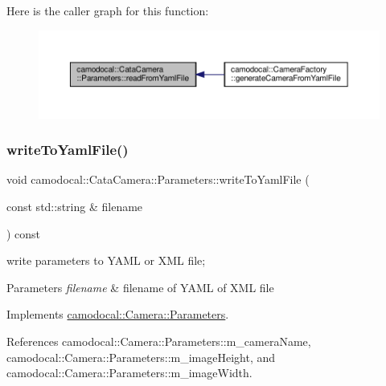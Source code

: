 Here is the caller graph for this function\+:\nopagebreak
\begin{figure}[H]
\begin{center}
\leavevmode
\includegraphics[width=350pt]{classcamodocal_1_1CataCamera_1_1Parameters_a756399dd928f1a0a9b0eb7922361939f_icgraph}
\end{center}
\end{figure}
\mbox{\label{classcamodocal_1_1CataCamera_1_1Parameters_a9bd3a31bc31a3f4e1becfbd2bbb43331}} 
\subsubsection{\texorpdfstring{write\+To\+Yaml\+File()}{writeToYamlFile()}}
{\footnotesize\ttfamily void camodocal\+::\+Cata\+Camera\+::\+Parameters\+::write\+To\+Yaml\+File (\begin{DoxyParamCaption}\item[{const std\+::string \&}]{filename }\end{DoxyParamCaption}) const\hspace{0.3cm}{\ttfamily [virtual]}}



write parameters to Y\+A\+ML or X\+ML file; 


\begin{DoxyParams}{Parameters}
{\em filename} & filename of Y\+A\+ML of X\+ML file \\
\hline
\end{DoxyParams}


Implements \hyperlink{classcamodocal_1_1Camera_1_1Parameters_a7da3e505d5b047c7bfa3cf94d6c97710}{camodocal\+::\+Camera\+::\+Parameters}.



References camodocal\+::\+Camera\+::\+Parameters\+::m\+\_\+camera\+Name, camodocal\+::\+Camera\+::\+Parameters\+::m\+\_\+image\+Height, and camodocal\+::\+Camera\+::\+Parameters\+::m\+\_\+image\+Width.



